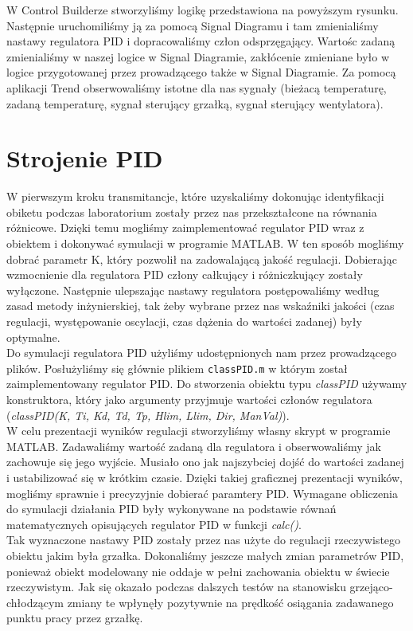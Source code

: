 \documentclass[12pt, a4paper]{article}
\begin{document}
W Control Builderze stworzyliśmy logikę przedstawiona na powyższym rysunku. Następnie uruchomiliśmy ją za pomocą Signal Diagramu i tam zmienialiśmy nastawy regulatora PID i dopracowaliśmy człon odsprzęgający. Wartośc zadaną zmienialiśmy w naszej logice w Signal Diagramie, zakłócenie zmieniane było w logice przygotowanej przez prowadzącego także w Signal Diagramie. Za pomocą aplikacji Trend obserwowaliśmy istotne dla nas sygnały (bieżacą temperaturę, zadaną temperaturę, sygnał sterujący grzałką, sygnał sterujący wentylatora).

\section{Strojenie PID}
W pierwszym kroku transmitancje, które uzyskaliśmy dokonując identyfikacji obiketu podczas laboratorium zostały przez nas przekształcone na równania różnicowe. Dzięki temu mogliśmy zaimplementować regulator PID wraz z obiektem i dokonywać symulacji w programie MATLAB. W ten sposób mogliśmy dobrać parametr K, który pozwolił na zadowalającą jakość regulacji. Dobierając wzmocnienie dla regulatora PID człony całkujący i różniczkujący zostały wyłączone. Następnie ulepszając nastawy regulatora postępowaliśmy według zasad metody inżynierskiej, tak żeby wybrane przez nas wskaźniki jakości (czas regulacji, występowanie oscylacji, czas dążenia do wartości zadanej) były optymalne.
\\Do symulacji regulatora PID użyliśmy udostępnionych nam przez prowadzącego plików. Posłużyliśmy się głównie plikiem \verb|classPID.m| w którym został zaimplementowany regulator PID. Do stworzenia obiektu typu \textit{classPID} używamy konstruktora, który jako argumenty przyjmuje wartości członów regulatora (\textit{classPID(K, Ti, Kd, Td, Tp, Hlim, Llim, Dir, ManVal)}). 
\\W celu prezentacji wyników regulacji stworzyliśmy własny skrypt w programie MATLAB. Zadawaliśmy wartość zadaną dla regulatora i obserwowaliśmy jak zachowuje się jego wyjście. Musiało ono jak najszybciej dojść do wartości zadanej i ustabilizować się w krótkim czasie. Dzięki takiej graficznej prezentacji wyników, mogliśmy sprawnie i precyzyjnie dobierać paramtery PID. Wymagane obliczenia do symulacji działania PID były wykonywane na podstawie równań matematycznych opisujących regulator PID w funkcji \textit{calc()}.
\\Tak wyznaczone nastawy PID zostały przez nas użyte do regulacji rzeczywistego obiektu jakim była grzałka. Dokonaliśmy jeszcze małych zmian parametrów PID, ponieważ obiekt modelowany nie oddaje w pełni zachowania obiektu w świecie rzeczywistym. Jak się okazało podczas dalszych testów na stanowisku grzejąco-chłodzącym zmiany te wpłynęły pozytywnie na prędkość osiągania zadawanego punktu pracy przez grzałkę. 
\newpage
\end{document}
